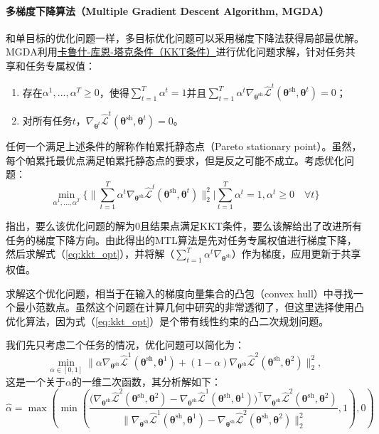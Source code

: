 \documentclass{ctexart}
\begin{document}
\paragraph{多梯度下降算法（Multiple Gradient Descent Algorithm, MGDA）}和单目标的优化问题一样，多目标优化问题可以采用梯度下降法获得局部最优解。MGDA\cite{Desideri12MGDA}利用\href{https://zh.wikipedia.org/wiki/%E5%8D%A1%E9%B2%81%E4%BB%80-%E5%BA%93%E6%81%A9-%E5%A1%94%E5%85%8B%E6%9D%A1%E4%BB%B6}{卡鲁什-库恩-塔克条件（KKT条件）}进行优化问题求解，针对任务共享和任务专属权值：
\begin{enumerate}
    \item 存在$\alpha^1, \ldots, \alpha^T \geq 0$，使得$\sum^T_{t=1}\alpha^t = 1$并且$\sum^T_{t=1}\alpha^t \nabla_{\bm\theta^\mathrm{sh}} \hat{\mathcal{L}}^t(\bm\theta^\mathrm{sh},\bm\theta^t) = 0$；
    \item 对所有任务$t$，$\nabla_{\bm\theta^t} \hat{\mathcal{L}}^t(\bm\theta^\mathrm{sh},\bm\theta^t) = 0$。
\end{enumerate}
任何一个满足上述条件的解称作帕累托静态点（Pareto stationary point）。虽然，每个帕累托最优点满足帕累托静态点的要求，但是反之可能不成立。考虑优化问题：
\begin{equation}
    \min_{\alpha^1,\ldots,\alpha^T}  \Bigg\{  \bigg\| \sum_{t=1}^T \alpha^t \nabla_{\bm\theta^\mathrm{sh}}  \hat{\mathcal{L}}^t(\bm\theta^\mathrm{sh},\bm\theta^t) \bigg\|_2^2 \bigg |  \sum_{t=1}^T \alpha^t = 1, \alpha^t \geq 0 \quad \forall t \Bigg\}
    \label{eq:kkt_opt}
\end{equation}

\citet{Desideri12MGDA}指出，要么该优化问题的解为$0$且结果点满足KKT条件，要么该解给出了改进所有任务的梯度下降方向。由此得出的MTL算法是先对任务专属权值进行梯度下降，然后求解式（\ref{eq:kkt_opt}），并将解（$\sum_{t=1}^T\alpha^t \nabla_{\bm\theta^\mathrm{sh}}$）作为梯度，应用更新于共享权值。

求解这个优化问题，相当于在输入的梯度向量集合的凸包（convex hull）中寻找一个最小范数点。虽然这个问题在计算几何中研究的非常透彻了，但这里\citet{Sener18Pareto}选择使用凸优化算法，因为式（\ref{eq:kkt_opt}）是个带有线性约束的凸二次规划问题。

我们先只考虑二个任务的情况，优化问题可以简化为：
$$\min_{\alpha \in [0,1]} \| \alpha \nabla_{\bm\theta^\mathrm{sh}}\hat{\mathcal{L}}^1(\bm\theta^\mathrm{sh},\bm\theta^1)+ (1-\alpha) \nabla_{\bm\theta^\mathrm{sh}}\hat{\mathcal{L}}^2(\bm\theta^\mathrm{sh},\bm\theta^2) \|_2^2,$$
这是一个关于$\alpha$的一维二次函数，其分析解如下：
\begin{equation}
\hat{\alpha}= \max\left(\min\left(\frac{\big(\nabla_{\bm\theta^\mathrm{sh}}\hat{\mathcal{L}}^2(\bm\theta^\mathrm{sh},\bm\theta^2) - \nabla_{\bm\theta^\mathrm{sh}}\hat{\mathcal{L}}^1(\bm\theta^\mathrm{sh},\bm\theta^1)\big)^\intercal  \nabla_{\bm\theta^\mathrm{sh}}\hat{\mathcal{L}}^2(\bm\theta^\mathrm{sh},\bm\theta^2)  }{\|\nabla_{\bm\theta^\mathrm{sh}}\hat{\mathcal{L}}^1(\bm\theta^\mathrm{sh},\bm\theta^1) - \nabla_{\bm\theta^\mathrm{sh}}\hat{\mathcal{L}}^2(\bm\theta^\mathrm{sh},\bm\theta^2)\|_2^2}, 1\right), 0\right)
\label{eq:two_task_sol}
\end{equation}
\end{document}
